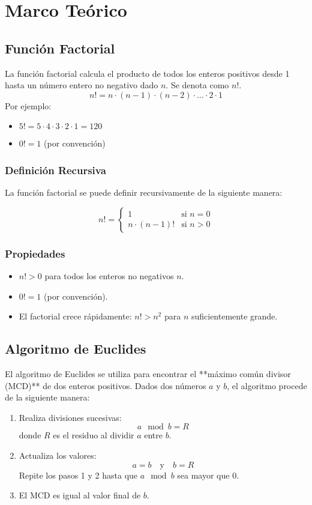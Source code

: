 \documentclass[conference]{IEEEtran}
\begin{document}
\section{Marco Te\'orico}


	\subsection{Función Factorial}
		La función factorial calcula el producto de todos los enteros positivos 
		desde 1 hasta un número entero no negativo dado \(n\). Se denota como \(n!\).
		\[ n! = n \cdot (n-1) \cdot (n-2) \cdot \ldots \cdot 2 \cdot 1 \]
		Por ejemplo:
		\begin{itemize}
			\item \(5! = 5 \cdot 4 \cdot 3 \cdot 2 \cdot 1 = 120\)
			\item \(0! = 1\) (por convención)
		\end{itemize}
		\subsubsection{Definición Recursiva}

			La función factorial se puede definir recursivamente de la siguiente manera:

			\[ n! = \begin{cases}
				1 & \text{si } n = 0 \\
				n \cdot (n-1)! & \text{si } n > 0
			\end{cases} \]
		\subsubsection{Propiedades}

		\begin{itemize}
				\item \(n! > 0\) para todos los enteros no negativos \(n\).
				\item \(0! = 1\) (por convención).
				\item El factorial crece rápidamente: \(n! > n^2\) para \(n\) suficientemente grande.
			\end{itemize}
	\subsection{Algoritmo de Euclides}
		El algoritmo de Euclides se utiliza para encontrar el 
		**máximo común divisor (MCD)** de dos enteros positivos.
		Dados dos números \(a\) y \(b\), el algoritmo procede de la siguiente manera:
		\begin{enumerate}
			\item Realiza divisiones sucesivas:
				\[ a \mod b = R \]
				donde \(R\) es el residuo al dividir \(a\) entre \(b\).
			\item Actualiza los valores:
				\[ a = b \quad \text{y} \quad b = R \]
				Repite los pasos 1 y 2 hasta que \(a \mod b\) sea mayor que 0.
			\item El MCD es igual al valor final de \(b\).
		\end{enumerate}
\end{document}
